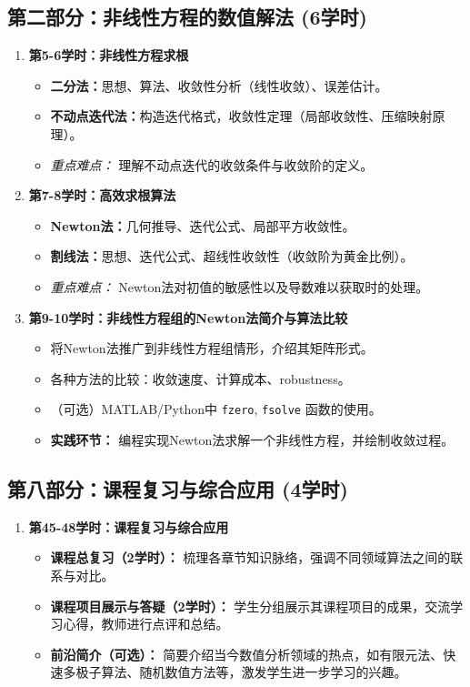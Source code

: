\documentclass[12pt, a4paper]{article} %
\begin{document}
	\subsection{第二部分：非线性方程的数值解法 (6学时)}
	\begin{enumerate}
		\item \textbf{第5-6学时：非线性方程求根}
		\begin{itemize}
			\item \textbf{二分法：}思想、算法、收敛性分析（线性收敛）、误差估计。
			\item \textbf{不动点迭代法：}构造迭代格式，收敛性定理（局部收敛性、压缩映射原理）。
			\item \textit{重点难点：} 理解不动点迭代的收敛条件与收敛阶的定义。
		\end{itemize}
		
		\item \textbf{第7-8学时：高效求根算法}
		\begin{itemize}
			\item \textbf{Newton法：}几何推导、迭代公式、局部平方收敛性。
			\item \textbf{割线法：}思想、迭代公式、超线性收敛性（收敛阶为黄金比例）。
			\item \textit{重点难点：} Newton法对初值的敏感性以及导数难以获取时的处理。
		\end{itemize}
		
		\item \textbf{第9-10学时：非线性方程组的Newton法简介与算法比较}
		\begin{itemize}
			\item 将Newton法推广到非线性方程组情形，介绍其矩阵形式。
			\item 各种方法的比较：收敛速度、计算成本、robustness。
			\item （可选）MATLAB/Python中 \texttt{fzero}, \texttt{fsolve} 函数的使用。
			\item \textbf{实践环节：} 编程实现Newton法求解一个非线性方程，并绘制收敛过程。
		\end{itemize}
	\end{enumerate}
	
	
	\subsection{第八部分：课程复习与综合应用 (4学时)}
	\begin{enumerate}
		\item \textbf{第45-48学时：课程复习与综合应用}
		\begin{itemize}
			\item \textbf{课程总复习（2学时）：} 梳理各章节知识脉络，强调不同领域算法之间的联系与对比。
			\item \textbf{课程项目展示与答疑（2学时）：} 学生分组展示其课程项目的成果，交流学习心得，教师进行点评和总结。
			\item \textbf{前沿简介（可选）：} 简要介绍当今数值分析领域的热点，如有限元法、快速多极子算法、随机数值方法等，激发学生进一步学习的兴趣。
		\end{itemize}
	\end{enumerate}
	
\end{document}
